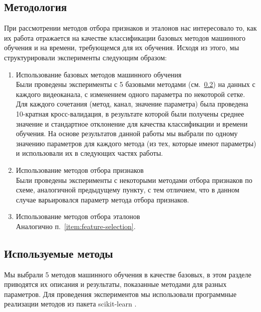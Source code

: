 \subsection{Методология}
При рассмотрении методов отбора признаков и эталонов нас интересовало то, как их работа отражается на качестве классификации базовых методов машинного обучения и на времени, требующемся для их обучения. Исходя из этого, мы структурировали эксперименты следующим образом:
\begin{enumerate}
    \item Использование базовых методов машинного обучения\\
    Были проведены эксперименты с 5 базовыми методами (см.~\ref{sec:base-methods}) на данных с каждого видеоканала, с изменением одного параметра по некоторой сетке. Для каждого сочетания (метод, канал, значение параметра) была проведена 10-кратная кросс-валидация, в результате которой были получены среднее значение и стандартное отклонение для качества классификации и времени обучения. На основе результатов данной работы мы выбрали по одному значению параметров для каждого метода (из тех, которые имеют параметры) и использовали их в следующих частях работы.
    \item Использование методов отбора признаков\\\label{item:feature-selection}
    Были проведены эксперименты с некоторыми методами отбора признаков по схеме, аналогичной предыдущему пункту, с тем отличием, что в данном случае варьировался параметр метода отбора признаков.
    \item Использование методов отбора эталонов\\
    Аналогично п.~\ref{item:feature-selection}.
\end{enumerate}

\subsection{Используемые методы}\label{sec:base-methods}
Мы выбрали 5 методов машинного обучения в качестве базовых, в этом разделе приводятся их описания и результаты, показанные методами для разных параметров. Для проведения экспериментов мы использовали программные реализации методов из пакета scikit-learn \cite{sklearn}.

